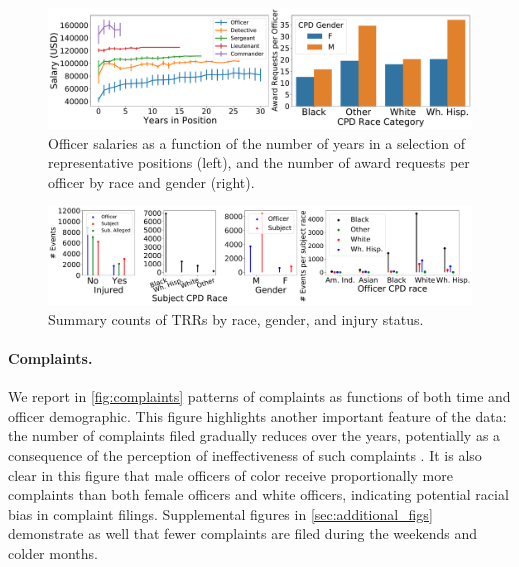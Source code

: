 \begin{figure}[t!] 
\includegraphics[width=\textwidth]{figs/salary_awards.pdf} 
\caption{Officer salaries as a function of the number of years in a selection of representative positions (left),
and the number of award requests per officer by race and gender (right).} \label{fig:salary_awards}
\end{figure}
\begin{figure}[t!] 
	\includegraphics[width=\textwidth]{figs/trr_stats} 
	\caption{Summary counts of TRRs by race, gender, and injury status.} \label{fig:trrs_stats1}
\end{figure}


\paragraph{Complaints.} 
We report in \cref{fig:complaints} patterns of complaints as functions of both time
and officer demographic. This figure highlights another important feature of the data: 
the number of complaints filed gradually reduces over the years, potentially as a 
consequence of the perception of ineffectiveness of such complaints \cite{xx}.
It is also clear in this figure that male officers of color receive proportionally more complaints
than both female officers and white officers, indicating potential racial bias in complaint filings.
Supplemental figures in \cref{sec:additional_figs} demonstrate as well that fewer complaints are 
filed during the weekends and colder months.

